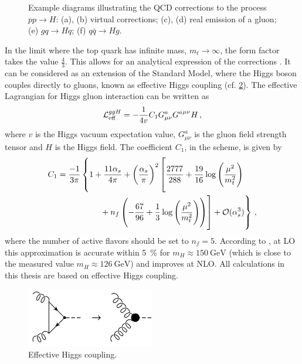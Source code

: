 \begin{figure}
\begin{subfigure}[]{0.3\textwidth}
	\caption{}
\end{subfigure}
\caption{Example diagrams illustrating the QCD corrections to the process $pp \rightarrow H$:
		(a), (b) virtual corrections; (c), (d) real emission of a gluon; (e) $gq \rightarrow Hq$; (f) $q \bar q \rightarrow Hg$.}
\label{fig:ggh_corrections}
\end{figure}
%

In the limit where the top quark has infinite mass, $m_t \rightarrow \infty$, the form factor takes the value $\frac{4}{3}$.
This allows for an analytical expression of the corrections \cite{gfusionnlo2}.
It can be considered as an extension of the Standard Model, where the Higgs boson couples directly to gluons, known as effective Higgs coupling (cf. \cref{fig:heft}).
The effective Lagrangian for Higgs gluon interaction can be written as \cite{gfusionnnlo2}
%
\begin{equation}
	\operatorname{\mathcal{L}}_\text{eff}^{ggH} = - \frac{1}{4v} C_1 G_{\mu \nu}^a {G^a}^{\mu \nu} H \, ,
\end{equation}
%
where $v$ is the Higgs vacuum expectation value, $G^a_{\mu \nu}$ is the gluon field strength tensor and $H$ is the Higgs field.
The coefficient $C_1$, in the \msbar{} scheme, is given by
%
\begin{align}
	C_1 = \frac{-1}{3 \pi} &\left\{1 + \frac{11 \alpha_s}{4 \pi} + \left( \frac{\alpha_s}{\pi} \right)^2 \left[ \frac{2777}{288} + \frac{19}{16} \log\left( \frac{\mu^2}{m_t^2} \right)
	\vphantom{n_f \left( -\frac{67}{96} + \frac{1}{3} \log\left( \frac{\mu^2}{m_t^2} \right) \right)} \right. \right. \nonumber \\
		&\qquad \left. \left. \vphantom{\frac{2777}{288} + \frac{19}{16} \log\left( \frac{\mu^2}{m_t^2} \right)}
		+ n_f \left( -\frac{67}{96} + \frac{1}{3} \log\left( \frac{\mu^2}{m_t^2} \right) \right) \right] + \order{\alpha_s^3} \right\} \, ,
\end{align}
%
where the number of active flavors should be set to $n_f = 5$.
According to \cite{gfusionnnlo2}, at LO this approximation is accurate within \SI{5}{\percent} for $m_H \approx \SI{150}{\giga\electronvolt}$ (which is close to the measured value $m_H \approx \SI{126}{\giga\electronvolt}$) and improves at NLO.
All calculations in this thesis are based on effective Higgs coupling.
%
\begin{figure}[]
	\includegraphics[width=0.5\textwidth]{images/heft.pdf}
	\caption{Effective Higgs coupling.}
	\label{fig:heft}
\end{figure}
%

